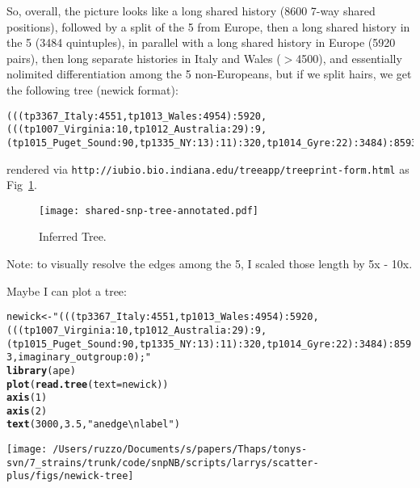 \documentclass{article}\usepackage[]{graphicx}\usepackage[]{color}
\makeatletter
\def\maxwidth{ %
  \ifdim\Gin@nat@width>\linewidth
    \linewidth
  \else
    \Gin@nat@width
  \fi
}
\newcommand{\hlnum}[1]{\textcolor[rgb]{0.686,0.059,0.569}{#1}}%
\newcommand{\hlstr}[1]{\textcolor[rgb]{0.192,0.494,0.8}{#1}}%
\newcommand{\hlstd}[1]{\textcolor[rgb]{0.345,0.345,0.345}{#1}}%
\newcommand{\hlkwb}[1]{\textcolor[rgb]{0.69,0.353,0.396}{#1}}%
\newcommand{\hlkwc}[1]{\textcolor[rgb]{0.333,0.667,0.333}{#1}}%
\newcommand{\hlkwd}[1]{\textcolor[rgb]{0.737,0.353,0.396}{\textbf{#1}}}%
\newenvironment{kframe}{%
 \def\at@end@of@kframe{}%
 \ifinner\ifhmode%
  \def\at@end@of@kframe{\end{minipage}}%
  \begin{minipage}{\columnwidth}%
 \fi\fi%
 \def\FrameCommand##1{\hskip\@totalleftmargin \hskip-\fboxsep
 \colorbox{shadecolor}{##1}\hskip-\fboxsep
     \hskip-\linewidth \hskip-\@totalleftmargin \hskip\columnwidth}%
 \MakeFramed {\advance\hsize-\width
   \@totalleftmargin\z@ \linewidth\hsize
   \@setminipage}}%
 {\par\unskip\endMakeFramed%
 \at@end@of@kframe}
\newenvironment{knitrout}{}{} %
\makeatother
\begin{document}
So, overall, the picture looks like a long shared history (8600 7-way shared positions), followed by a split of the 5
from Europe, then a long shared history in the 5 (3484 quintuples), in parallel with a long shared history in Europe
(5920 pairs), then long separate histories in Italy and Wales ($>$4500), and essentially nolimited differentiation among the 5
non-Europeans, but if we split hairs, we get the following tree (newick format):
\begin{verbatim}
(((tp3367_Italy:4551,tp1013_Wales:4954):5920,(((tp1007_Virginia:10,tp1012_Australia:29):9,
(tp1015_Puget_Sound:90,tp1335_NY:13):11):320,tp1014_Gyre:22):3484):8593);
\end{verbatim}
rendered via {\tt http://iubio.bio.indiana.edu/treeapp/treeprint-form.html} as Fig~\ref{fig:tree}.
\begin{figure}
  \begin{center}
    \texttt{[image: shared-snp-tree-annotated.pdf]}
    \caption{Inferred Tree.}
    \label{fig:tree}
  \end{center}
\end{figure}
Note: to visually resolve the edges among the 5, I scaled those length by 5x - 10x.

Maybe I can plot a tree:
\begin{knitrout}\small
{}\color{fgcolor}\begin{kframe}
\begin{alltt}
\hlstd{newick} \hlkwb{<-} \hlstr{"(((tp3367_Italy:4551,tp1013_Wales:4954):5920,(((tp1007_Virginia:10,tp1012_Australia:29):9,(tp1015_Puget_Sound:90,tp1335_NY:13):11):320,tp1014_Gyre:22):3484):8593,imaginary_outgroup:0);"}
\hlkwd{library}\hlstd{(ape)}
\hlkwd{plot}\hlstd{(}\hlkwd{read.tree}\hlstd{(}\hlkwc{text} \hlstd{= newick))}
\hlkwd{axis}\hlstd{(}\hlnum{1}\hlstd{)}
\hlkwd{axis}\hlstd{(}\hlnum{2}\hlstd{)}
\hlkwd{text}\hlstd{(}\hlnum{3000}\hlstd{,} \hlnum{3.5}\hlstd{,} \hlstr{"an edge\textbackslash{}nlabel"}\hlstd{)}
\end{alltt}
\end{kframe}

{\centering \texttt{[image: /Users/ruzzo/Documents/s/papers/Thaps/tonys-svn/7\_strains/trunk/code/snpNB/scripts/larrys/scatter-plus/figs/newick-tree]} 

}



\end{knitrout}
\end{document}
